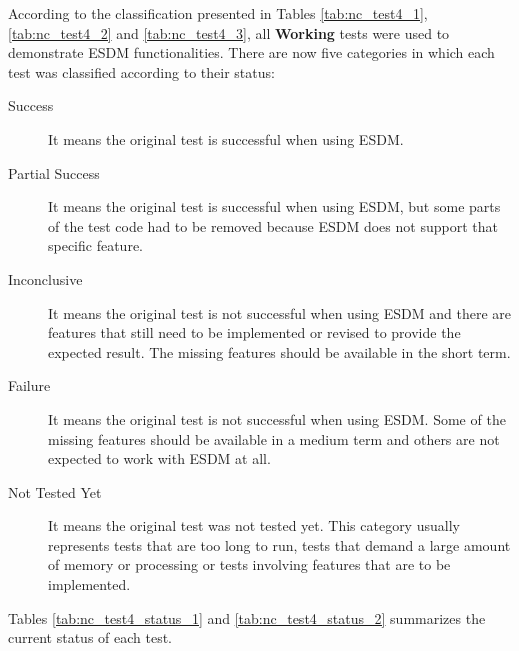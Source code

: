 According to the classification presented in Tables \ref{tab:nc_test4_1}, \ref{tab:nc_test4_2} and \ref{tab:nc_test4_3}, all {\bf Working} tests were used to demonstrate ESDM functionalities. There are now five categories in which each test was classified according to their status:

\begin{description}

\item[Success] It means the original test is successful when using ESDM.

\item[Partial Success] It means the original test is successful when using ESDM, but some parts of the test code had to be removed because ESDM does not support that specific feature.

\item[Inconclusive] It means the original test is not successful when using ESDM and there are features that still need to be implemented or revised to provide the expected result. The missing features should be available in the short term.

\item[Failure] It means the original test is not successful when using ESDM. Some of the missing features should be available in a medium term and others are not expected to work with ESDM at all.

\item[Not Tested Yet] It means the original test was not tested yet. This category usually represents tests that are too long to run, tests that demand a large amount of memory or processing or tests involving features that are to be implemented.

\end{description}

Tables \ref{tab:nc_test4_status_1} and \ref{tab:nc_test4_status_2} summarizes the current status of each test.

